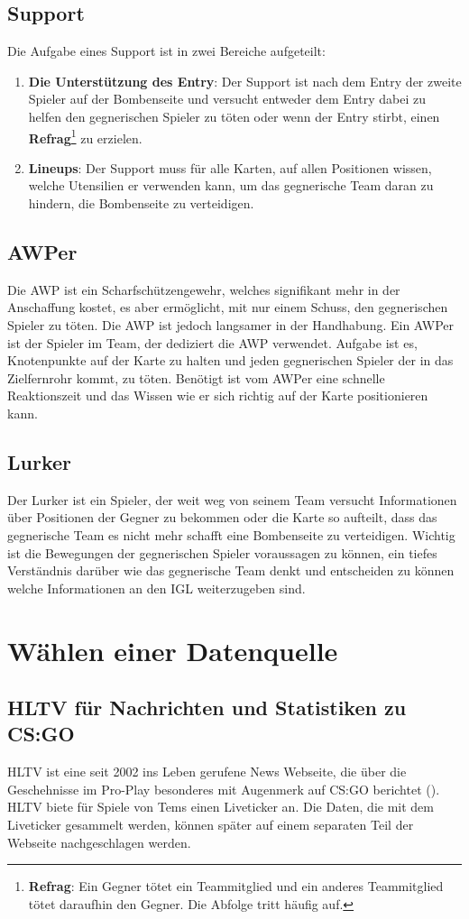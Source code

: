 \documentclass[envcountsame, envcountchap, deutsch]{i-studis}
\begin{document}
\subsection{Support}
Die Aufgabe eines Support ist in zwei Bereiche aufgeteilt:
\begin{enumerate}
    \item \textbf{Die Unterstützung des Entry}: Der Support ist nach dem Entry der zweite Spieler auf der Bombenseite und versucht entweder dem Entry 
    dabei zu helfen den gegnerischen Spieler zu töten oder wenn der Entry stirbt, einen \textbf{Refrag}\footnote{\textbf{Refrag}: Ein Gegner tötet ein Teammitglied und ein anderes Teammitglied tötet daraufhin den Gegner. Die Abfolge tritt häufig auf.} zu erzielen.
    \item \textbf{Lineups}: Der Support muss für alle Karten, auf allen Positionen wissen, welche Utensilien er verwenden kann, um das gegnerische 
    Team daran zu hindern, die Bombenseite zu verteidigen.
\end{enumerate}
\subsection{AWPer}
Die AWP ist ein Scharfschützengewehr, welches signifikant mehr in der Anschaffung kostet, es aber ermöglicht, mit nur einem Schuss, den gegnerischen 
Spieler zu töten. Die AWP ist jedoch langsamer in der Handhabung. Ein AWPer ist der Spieler im Team, der dediziert die AWP verwendet. 
Aufgabe ist es, Knotenpunkte auf der Karte zu halten und jeden gegnerischen Spieler der in das Zielfernrohr kommt, zu töten. 
Benötigt ist vom AWPer eine schnelle Reaktionszeit und das Wissen wie er sich richtig auf der Karte positionieren kann. 
\subsection{Lurker}
Der Lurker ist ein Spieler, der weit weg von seinem Team versucht Informationen über Positionen der Gegner zu bekommen oder die Karte so aufteilt, 
dass das gegnerische Team es nicht mehr schafft eine Bombenseite zu verteidigen. Wichtig ist die Bewegungen der gegnerischen Spieler 
voraussagen zu können, ein tiefes Verständnis darüber wie das gegnerische Team denkt und entscheiden zu können welche Informationen 
an den IGL weiterzugeben sind.
\section{Wählen einer Datenquelle}
\subsection{HLTV für Nachrichten und Statistiken zu CS:GO}
HLTV ist eine seit 2002 ins Leben gerufene News Webseite, die über die Geschehnisse im Pro-Play besonderes mit Augenmerk auf CS:GO berichtet (\cite{A/S_2015}). 
HLTV biete für Spiele von Tems einen Liveticker an. Die Daten, die mit dem Liveticker gesammelt werden, können später auf einem separaten 
Teil der Webseite nachgeschlagen werden.
\end{document}
